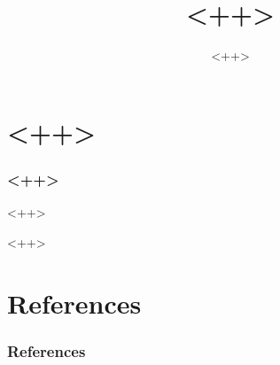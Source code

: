 \documentclass{beamer}
\title{<++>}
\author{<++>}
\institute{<++>}
\begin{document}
\ttfamily
\begin{frame}

\maketitle

\end{frame}

\section{<++>}

\begin{frame}
\frametitle{<++>}

<++>

\end{frame}

<++>

\section{References}

\begin{frame}
\frametitle{References}
\printbibliography
\end{frame}
\end{document}
